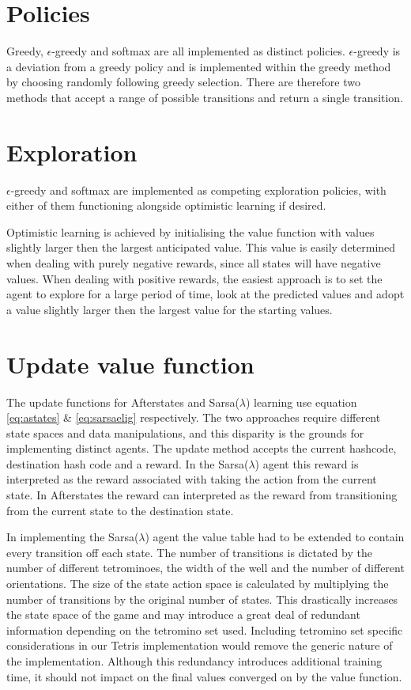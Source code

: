 \documentclass{rucsthesis}
\begin{document}
\section{Policies}

Greedy, $\epsilon$-greedy and softmax are all implemented as distinct policies. $\epsilon$-greedy is a deviation from a greedy policy and is implemented within the greedy method by choosing randomly following greedy selection. There are therefore two methods that accept a range of possible transitions and return a single transition.

\section{Exploration}

$\epsilon$-greedy and softmax are implemented as competing exploration policies, with either of them functioning alongside optimistic learning if desired. 

Optimistic learning is achieved by initialising the value function with values slightly larger then the largest anticipated value. This value is easily determined when dealing with purely negative rewards, since all states will have negative values. When dealing with positive rewards, the easiest approach is to set the agent to explore for a large period of time, look at the predicted values and adopt a value slightly larger then the largest value for the starting values.

\section{Update value function}

The update functions for Afterstates and Sarsa($\lambda$) learning use equation \ref{eq:astates} \& \ref{eq:sarsaelig} respectively. The two approaches require different state spaces and data manipulations, and this disparity is the grounds for implementing distinct agents. The update method accepts the current hashcode, destination hash code and a reward. In the Sarsa($\lambda$) agent this reward is interpreted as the reward associated with taking the action from the current state. In Afterstates the reward can interpreted as the reward from transitioning from the current state to the destination state. 

In implementing the Sarsa($\lambda$) agent the value table had to be extended to contain every transition off each state. The number of transitions is dictated by the number of different tetrominoes, the width of the well and the number of different orientations.  The size of the state action space is calculated by multiplying the number of transitions by the original number of states. This drastically increases the state space of the game and may introduce a great deal of redundant information depending on the tetromino set used. Including tetromino set specific considerations in our Tetris implementation would remove the generic nature of the implementation. Although this redundancy introduces additional training time, it should not impact on the final values converged on by the value function.
\end{document}
